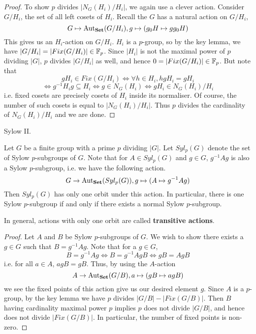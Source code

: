 \documentclass[../../book.tex]{subfiles}
\begin{document}
\begin{proof}
    To show $p$ divides $|N_G(H_i) / H_i|$, we again use a clever action.
    Consider $G / H_i$, the set of all left cosets of $H_i$.
    Recall the $G$ has a natural action on $G / H_i$, \[
        G \mapsto \text{Aut}_{\mathbf{Set}}(G / H_i), g \mapsto (g_0H \mapsto g g_0H)
    \]
    This gives us an $H_i$-action on $G / H_i$. 
    $H_i$ is a $p$-group, so by the key lemma,
    we have $|G / H_i| = |Fix(G / H_i)| \in \mathbb{F}_p$.
    Since $|H_i|$ is not the maximal power of $p$ dividing $|G|$,
    $p$ divides $|G / H_i|$ as well, and hence $0 = |Fix(G / H_i)| \in \mathbb{F}_p$. 
    But note that \[
        gH_i \in Fix(G / H_i) 
        \iff \forall h \in H_i, h gH_i = gH_i
    \]
    \[
        \iff g^{-1} H_i g \subseteq H_i
        \iff g \in N_G(H_i) 
        \iff gH_i \in N_G(H_i) / H_i
    \]
    i.e. fixed cosets are precisely cosets of $H_i$ inside its normaliser. 
    Of course, the number of such cosets is equal to $|N_G(H_i) / H_i|$.
    Thus $p$ divides the cardinality of $N_G(H_i) / H_i$ and we are done. 
    
\end{proof}

\begin{thm} Sylow II.
    
    Let $G$ be a finite group with a prime $p$ dividing $|G|$.
    Let $Syl_p(G)$ denote the set of Sylow $p$-subgroups of $G$. 
    Note that for $A \in Syl_p(G)$ and $g \in G$, 
    $g^{-1} A g$ is also a Sylow $p$-subgroup,
    i.e. we have the following action. \[
        G \to \text{Aut}_{\mathbf{Set}}(Syl_p(G)), g \mapsto (A \mapsto g^{-1} A g)
    \]
    Then $Syl_p(G)$ has only one orbit under this action.
    In particular, there is one Sylow $p$-subgroup if and only if 
    there exists a normal Sylow $p$-subgroup. 
    
    In general, actions with only one orbit are called
    \textbf{transitive actions}. 
\end{thm}
\begin{proof}
    
    Let $A$ and $B$ be Sylow $p$-subgroups of $G$. 
    We wish to show there exists a $g \in G$ such that $B = g^{-1} A g$. 
    Note that for a $g \in G$, 
    \[
        B = g^{-1} A g \iff B = g^{-1} A g B \iff g B = A g B
    \]
    i.e. for all $a \in A$, $a g B = g B$. 
    Thus, by using the $A$-action \[
        A \to \text{Aut}_{\mathbf{Set}}(G / B), a \mapsto (gB \mapsto a gB)
    \]
    we see the fixed points of this action give us our desired element $g$. 
    Since $A$ is a $p$-group, by the key lemma we have
    $p$ divides $|G / B| - |Fix(G / B)|$.
    Then $B$ having cardinality maximal power $p$ implies 
    $p$ does not divide $|G / B|$, 
    and hence does not divide $|Fix(G / B)|$.
    In particular, the number of fixed points is non-zero. 
    
\end{proof}
\end{document}
